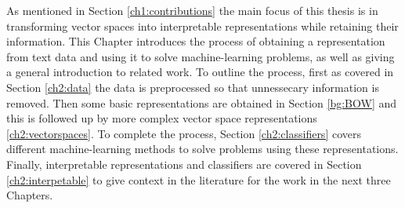 

















As mentioned in Section \ref{ch1:contributions} the main focus of this thesis is in transforming vector spaces into interpretable representations while retaining their information. This Chapter introduces the process of obtaining a representation from text data and using it to solve machine-learning problems, as well as giving a general introduction to related work. To outline the process, first as covered in Section \ref{ch2:data} the data is preprocessed so that unnessecary information is removed. Then some basic representations are obtained in Section \ref{bg:BOW} and this is followed up by more complex vector space representations \ref{ch2:vectorspaces}. To complete the process, Section \ref{ch2:classifiers} covers different machine-learning methods to solve problems using these representations. Finally, interpretable representations and classifiers are covered in Section \ref{ch2:interpetable} to give context in the literature for the work in the next three Chapters. 

